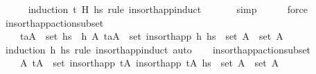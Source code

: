 \begin{isabellebody}
\ \ \ \ \isamarkupfalse%
\ {\isacharparenleft}{\kern0pt}induction\ {\isachardoublequoteopen}{\isacharparenleft}{\kern0pt}t{\isacharcomma}{\kern0pt}\ H{\isacharprime}{\kern0pt}{\isacharparenright}{\kern0pt}{\isachardoublequoteclose}\ hs\ rule{\isacharcolon}{\kern0pt}\ insort{\isacharunderscore}{\kern0pt}happ{\isachardot}{\kern0pt}induct{\isacharparenright}{\kern0pt}\isanewline
\ \ \ \ \ \isamarkupfalse%
\ simp\isanewline
\ \ \ \ \isamarkupfalse%
\ force%
\endisatagproof
{\isafoldproof}%
%
\isadelimproof
\isanewline
%
\endisadelimproof
\isanewline
\ \ \isamarkupfalse%
\ insort{\isacharunderscore}{\kern0pt}happ{\isacharunderscore}{\kern0pt}action{\isacharunderscore}{\kern0pt}subset{\isacharcolon}{\kern0pt}\ \isanewline
\ \ \ \ {\isachardoublequoteopen}{\isasymforall}{\isacharparenleft}{\kern0pt}t\isactrlsub a{\isacharcomma}{\kern0pt}A{\isacharparenright}{\kern0pt}\ {\isasymin}\ set\ hs\ {\isasymunion}\ {\isacharbraceleft}{\kern0pt}h{\isacharbraceright}{\kern0pt}{\isachardot}{\kern0pt}\ {\isasymexists}A{\isacharprime}{\kern0pt}{\isachardot}{\kern0pt}\ {\isacharparenleft}{\kern0pt}t\isactrlsub a{\isacharcomma}{\kern0pt}A{\isacharprime}{\kern0pt}{\isacharparenright}{\kern0pt}\ {\isasymin}\ set\ {\isacharparenleft}{\kern0pt}insort{\isacharunderscore}{\kern0pt}happ\ h\ hs{\isacharparenright}{\kern0pt}\ {\isasymand}\ set\ A\ {\isasymsubseteq}\ set\ A{\isacharprime}{\kern0pt}{\isachardoublequoteclose}\isanewline
%
\isadelimproof
\ \ \ \ %
\endisadelimproof
%
\isatagproof
{}\isamarkupfalse%
\ {\isacharparenleft}{\kern0pt}induction\ h\ hs\ rule{\isacharcolon}{\kern0pt}\ insort{\isacharunderscore}{\kern0pt}happ{\isachardot}{\kern0pt}induct{\isacharparenright}{\kern0pt}\ auto{\isacharplus}{\kern0pt}%
\endisatagproof
{\isafoldproof}%
%
\isadelimproof
\isanewline
%
\endisadelimproof
\isanewline
\ \ \isamarkupfalse%
\ insort{\isacharunderscore}{\kern0pt}happ{}{\isacharunderscore}{\kern0pt}action{\isacharunderscore}{\kern0pt}subset{\isacharcolon}{\kern0pt}\ \isanewline
\ \ \ \ {\isachardoublequoteopen}{\isasymexists}A{\isacharprime}{\kern0pt}{\isachardot}{\kern0pt}\ {\isacharparenleft}{\kern0pt}tA{\isacharprime}{\kern0pt}{\isacharparenright}{\kern0pt}\ {\isasymin}\ set\ {\isacharparenleft}{\kern0pt}insort{\isacharunderscore}{\kern0pt}happ\ {\isacharparenleft}{\kern0pt}tA\ {\isacharparenleft}{\kern0pt}insort{\isacharunderscore}{\kern0pt}happ\ {\isacharparenleft}{\kern0pt}tA\ hs{\isacharparenright}{\kern0pt}{\isacharparenright}{\kern0pt}\ {\isasymand}\ set\ A\ {\isasymsubseteq}\ set\ A{\isacharprime}{\kern0pt}{\isachardoublequoteclose}\isanewline

\end{isabellebody}
